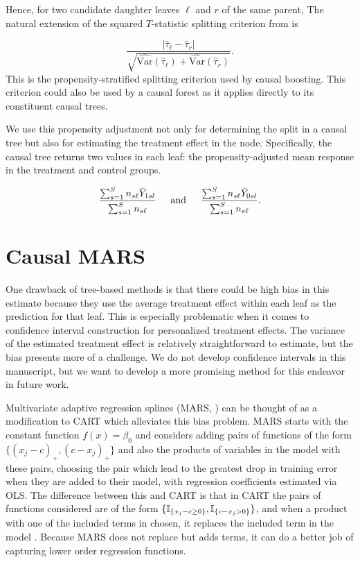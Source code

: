 \documentclass{article}
\begin{document}
Hence, for two candidate daughter leaves $\ell$ and $r$ of the same parent,
The natural extension of the squared $T$-statistic splitting criterion from
\cite{AtheyImbens16} is 

$$\frac{|\hat\tau_\ell - \hat\tau_r|}{\sqrt{\widehat{\mbox{Var}}
  (\hat\tau_\ell)+\widehat{\mbox{Var}}(\hat\tau_r)}}.$$
This is the propensity-stratified splitting criterion used by causal boosting.
This criterion could also be used by a causal forest as it applies directly to
its constituent causal trees.

We use this propensity adjustment not only for determining the split in a
causal tree but also for estimating the treatment effect in the node.
Specifically, the causal tree returns two values in each leaf: the
propensity-adjusted mean response in the treatment and control groups.

$$\frac{\sum_{s=1}^Sn_{s\ell}\bar Y_{1sl}}{\sum_{s=1}^Sn_{s\ell}}
  \hspace{4mm}\mbox{ and }\hspace{4mm}
  \frac{\sum_{s=1}^Sn_{s\ell}\bar Y_{0sl}}{\sum_{s=1}^Sn_{s\ell}}.$$




\section{Causal MARS}
\label{sec-causal-mars}

One drawback  of tree-based methods is that there could be high bias in this
estimate because they use the average treatment effect within each
leaf as the prediction for that leaf.
This is especially problematic when it comes to confidence interval
construction for personalized treatment effects. The variance of the estimated
treatment effect is relatively straightforward to estimate, but the bias
presents more of a challenge. We do not develop confidence
intervals in this manuscript, but we want to develop a more promising method
for this endeavor in future work.

Multivariate adaptive regression splines (MARS, \cite{Friedman91}) can be
thought of as a modification to CART which alleviates this bias problem. MARS
starts with the constant function $f(x) = \beta_0$ and considers adding pairs
of functions of the form $\{(x_j - c)_+, (c - x_j)_+\}$ and also the products
of variables in the model with these pairs, choosing the pair which lead to the
greatest drop in training error when they are added to their model, with
regression coefficients estimated via OLS. The difference between this and CART
is that in CART the pairs of functions considered are of the form
$\{\mathbb{I}_{\{x_j - c \ge 0\}}, \mathbb{I}_{\{c - x_j > 0\}}\}$, and when a product with
one of the included terms in chosen, it replaces the included term in the
model \citep{ESL}. Because MARS does not replace but adds terms, it can do a
better job of capturing lower order regression functions.
\end{document}
